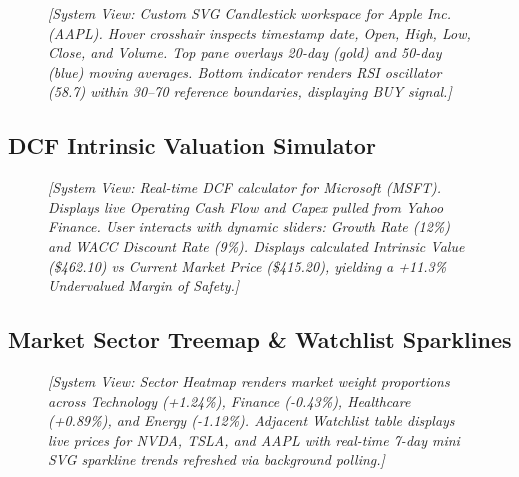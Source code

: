 \documentclass[12pt,a4paper]{report}
\begin{document}
\begin{figure}[h!]
\centering
\begin{tcolorbox}[colback=gray!10,colframe=gray!50,
  title=\textbf{Fig 4.3 -- Interactive SVG Chart Studio},fonttitle=\bfseries\small]
  \centering
  \vspace{0.3cm}
  {\small\textit{[System View: Custom SVG Candlestick workspace for Apple Inc. (AAPL). Hover crosshair inspects timestamp date, Open, High, Low, Close, and Volume. Top pane overlays 20-day (gold) and 50-day (blue) moving averages. Bottom indicator renders RSI oscillator (58.7) within 30--70 reference boundaries, displaying BUY signal.]}}
  \vspace{0.3cm}
\end{tcolorbox}
\end{figure}

\subsection{DCF Intrinsic Valuation Simulator}

\begin{figure}[h!]
\centering
\begin{tcolorbox}[colback=gray!10,colframe=gray!50,
  title=\textbf{Fig 4.4 -- DCF Valuation Simulator},fonttitle=\bfseries\small]
  \centering
  \vspace{0.3cm}
  {\small\textit{[System View: Real-time DCF calculator for Microsoft (MSFT). Displays live Operating Cash Flow and Capex pulled from Yahoo Finance. User interacts with dynamic sliders: Growth Rate (12\%) and WACC Discount Rate (9\%). Displays calculated Intrinsic Value (\$462.10) vs Current Market Price (\$415.20), yielding a +11.3\% Undervalued Margin of Safety.]}}
  \vspace{0.3cm}
\end{tcolorbox}
\end{figure}

\subsection{Market Sector Treemap \& Watchlist Sparklines}

\begin{figure}[h!]
\centering
\begin{tcolorbox}[colback=gray!10,colframe=gray!50,
  title=\textbf{Fig 4.5 -- Sector Heatmap \& Sparkline Watchlist},fonttitle=\bfseries\small]
  \centering
  \vspace{0.3cm}
  {\small\textit{[System View: Sector Heatmap renders market weight proportions across Technology (+1.24\%), Finance (-0.43\%), Healthcare (+0.89\%), and Energy (-1.12\%). Adjacent Watchlist table displays live prices for NVDA, TSLA, and AAPL with real-time 7-day mini SVG sparkline trends refreshed via background polling.]}}
  \vspace{0.3cm}
\end{tcolorbox}
\end{figure}
\end{document}

